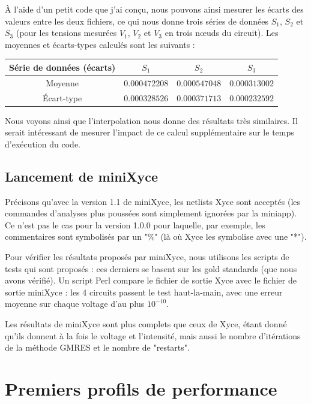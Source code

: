 \documentclass[11pt,a4paper,oneside]{memoir}
\theoremstyle{definition}
\theoremstyle{remark}
\theoremstyle{plain}
\begin{document}
\`A l'aide d'un petit code que j'ai conçu, nous pouvons ainsi mesurer les écarts des valeurs entre les deux fichiers, ce qui nous donne trois séries de données $S_1$, $S_2$ et $S_3$ (pour les tensions mesurées $V_1$, $V_2$ et $V_3$ en trois nœuds du circuit). Les moyennes et écarts-types calculés sont les suivants :
\begin{center}
\begin{tabular}{|c|c|c|c|}
\hline
Série de données (écarts) & $S_1$ & $S_2$ & $S_3$\\ \hline
Moyenne & $0.000472208$ & $0.000547048$ & $0.000313002$ \\ \hline
\'Ecart-type & $0.000328526$ & $0.000371713$ & $0.000232592$ \\ \hline
\end{tabular}
\end{center}

Nous voyons ainsi que l'interpolation nous donne des résultats très similaires. Il serait intéressant de mesurer l'impact de ce calcul supplémentaire sur le temps d'exécution du code.




\subsection{Lancement de miniXyce}

Précisons qu'avec la version 1.1 de miniXyce, les netlists Xyce sont acceptés (les commandes d'analyses plus poussées sont simplement ignorées par la miniapp). Ce n'est pas le cas pour la version 1.0.0 pour laquelle, par exemple, les commentaires sont symbolisés par un "\%" (là où Xyce les symbolise avec une "*").

Pour vérifier les résultats proposés par miniXyce, nous utilisons les scripts de tests qui sont proposés : ces derniers se basent sur les gold standards (que nous avons vérifié). Un script Perl compare le fichier de sortie Xyce avec le fichier de sortie miniXyce : les 4 circuits passent le test haut-la-main, avec une erreur moyenne sur chaque voltage d'au plus $10^{-10}$.

Les résultats de miniXyce sont plus complets que ceux de Xyce, étant donné qu'ils donnent à la fois le voltage et l'intensité, mais aussi le nombre d'itérations de la méthode GMRES et le nombre de "restarts".





\section{Premiers profils de performance}
\end{document}

